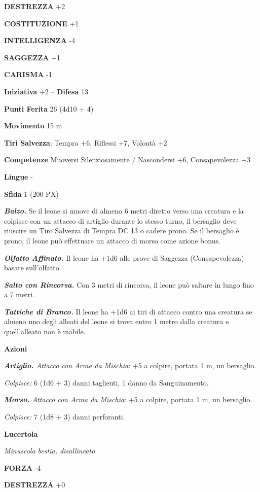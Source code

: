 \begin{multicols}{2}
\textbf{DESTREZZA} +2

\textbf{COSTITUZIONE} +1

\textbf{INTELLIGENZA} -4

\textbf{SAGGEZZA} +1

\textbf{CARISMA} -1

\textbf{Iniziativa} +2 -- \textbf{Difesa} 13

\textbf{Punti Ferita} 26 (4d10 + 4)

\textbf{Movimento} 15 m

\textbf{Tiri Salvezza}: Tempra +6, Riflessi +7, Volontà +2

\textbf{Competenze} Muoversi Silenziosamente / Nascondersi +6, Consapevolezza +3

\textbf{Lingue} -

\textbf{Sfida} 1 (200 PX)

\textit{\textbf{Balzo.}} Se il leone si muove di almeno 6 metri diretto verso una creatura e la colpisce con un attacco di artiglio durante lo stesso turno, il bersaglio deve riuscire un Tiro Salvezza di Tempra DC 13 o cadere prono. Se il bersaglio è prono, il leone può effettuare un
attacco di morso come azione bonus.

\textit{\textbf{Olfatto Affinato.}} Il leone ha +1d6 alle prove di Saggezza (Consapevolezza) basate sull'olfatto.

\textit{\textbf{Salto con Rincorsa.}} Con 3 metri di rincorsa, il leone può saltare in lungo fino a 7 metri.

\textit{\textbf{Tattiche di Branco.}} Il leone ha +1d6 ai tiri di attacco contro una creatura se almeno uno degli alleati del leone si trova entro 1 metro dalla creatura e quell'alleato non è inabile.

\textbf{Azioni}

\textit{\textbf{Artiglio.} Attacco con Arma da Mischia}: +5 a colpire, portata 1 m, un bersaglio.

\textit{Colpisce:} 6 (1d6 + 3) danni taglienti, 1 danno da Sanguinamento.

\textit{\textbf{Morso.} Attacco con Arma da Mischia}: +5 a colpire, portata 1 m, un bersaglio.

\textit{Colpisce:} 7 (1d8 + 3) danni perforanti.

\medskip\textbf{Lucertola}

\textit{Minuscola bestia, disallineato}

\textbf{FORZA} -4

\textbf{DESTREZZA} +0


\end{multicols}
